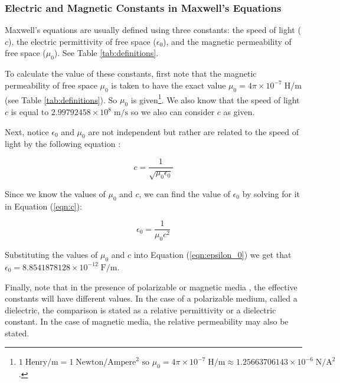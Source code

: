 \documentclass{article}
\theoremstyle{definition}
\begin{document}
\bigskip
\subsubsection{Electric and Magnetic Constants in Maxwell's Equations}
\label{subsubsec:electric_and_magnetic_constants}
Maxwell's equations are usually defined using three constants:
the speed of light ($c$), the electric permittivity of free space
($\epsilon_0$), and the magnetic permeability of free space
($\mu_0$). See Table \ref{tab:definitions}.

\bigskip
\noindent
To calculate the value of these constants, first note that the
magnetic permeability of free space $\mu_0$ is taken to have the
exact value $\mu_0 = 4\pi \times 10^{-7} \; \text{H}/\text{m}$
(see Table \ref{tab:definitions}).  So $\mu_0$ is
given\footnote{$1 \; \text{Henry/m} = 1 \;
\text{Newton}/\text{Ampere}^2 \text{ so } \mu_0 = 4\pi \times
10^{-7} \; \text{H}/\text{m} \approx 1.25663706143 \times 10^{-6}
\; \text{N}/\text{A}^2$.}. We also know that the speed of light
$c$ is equal to $2.99792458 \times 10^{8} \; \text{m/s}$ so we
also can consider $c$ as given.

\bigskip
\noindent
Next, notice $\epsilon_0$ and $\mu_0$ are not independent but
rather are related to the speed of light by the following
equation \cite{wikipedia:maxwells_equations}:

\medskip
\begin{equation}
c = \dfrac{1}{\sqrt{\mu_0\epsilon_0}}
\label{eqn:c}
\end{equation}

\bigskip
\noindent
Since we know the values of $\mu_0$ and $c$, we can find the
value of $\epsilon_0$ by solving for it in Equation
(\ref{eqn:c}):

\bigskip
\begin{equation}
\epsilon_0 = \dfrac{1}{\mu_0 c^2}
\label{eqn:epsilon_0}
\end{equation}

\bigskip
\noindent
Substituting the values of $\mu_0$ and $c$ into Equation
(\ref{eqn:epsilon_0}) we get that $\epsilon_0 = 8.8541878128
\times 10^{-12} \; \text{F/m}$. 

\bigskip
\noindent
Finally, note that in the presence of polarizable or magnetic
media \cite{wikipedia:polarization}, the effective constants will
have different values. In the case of a polarizable medium,
called a dielectric, the comparison is stated as a relative
permittivity or a dielectric constant. In the case of magnetic
media, the relative permeability may also be stated.
\end{document}
